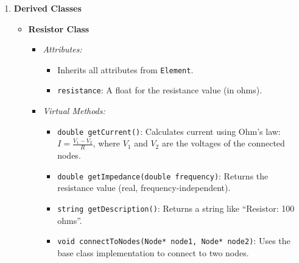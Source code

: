 \documentclass{article}
\begin{document}
\begin{enumerate}
    \item \textbf{Derived Classes}
    \begin{itemize}
        \item \textbf{Resistor Class}
        \begin{itemize}
            \item \textit{Attributes:}
            \begin{itemize}
                \item Inherits all attributes from \texttt{Element}.
                \item \texttt{resistance}: A float for the resistance value (in ohms).
            \end{itemize}
            \item \textit{Virtual Methods:}
            \begin{itemize}
                \item \texttt{double getCurrent()}: Calculates current using Ohm’s law: \( I = \frac{V_1 - V_2}{R} \), where \( V_1 \) and \( V_2 \) are the voltages of the connected nodes.
                \item \texttt{double getImpedance(double frequency)}: Returns the resistance value (real, frequency-independent).
                \item \texttt{string getDescription()}: Returns a string like “Resistor: 100 ohms”.
                \item \texttt{void connectToNodes(Node* node1, Node* node2)}: Uses the base class implementation to connect to two nodes.
            \end{itemize}
        \end{itemize}


\end{itemize}
\end{enumerate}
\end{document}
